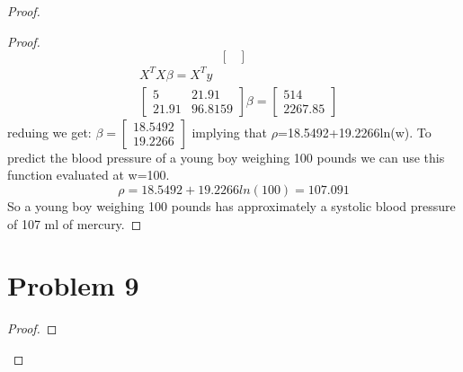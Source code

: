 \documentclass[12pt]{article}
\newcommand{\sect}[1]{\section*{#1}}
\begin{document}
\begin{proof}
\begin{proof}
\[\begin{bmatrix}
\end{bmatrix}
  \]
  \begin{align*}
    &X^TX\beta=X^Ty\\
    &\begin{bmatrix}
      5&21.91\\21.91&96.8159
  \end{bmatrix}\beta=\begin{bmatrix}
    514\\2267.85
\end{bmatrix}
  \end{align*}
  reduing we get: $\beta=\begin{bmatrix}
    18.5492\\19.2266
\end{bmatrix}$ implying that $\rho$=18.5492+19.2266ln(w).
To predict the blood pressure of a young boy weighing 100 pounds we can use this function evaluated at w=100.
\[
  \rho=18.5492+19.2266ln(100)=107.091
\]
So a young boy weighing 100 pounds has approximately a systolic blood pressure of 107 ml of mercury.
\end{proof}
\sect{Problem 9}
\begin{proof}


\end{proof}
\end{proof}
\end{document}
